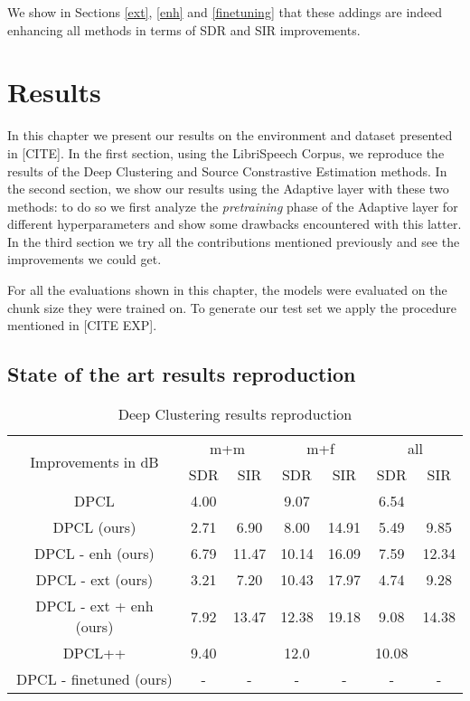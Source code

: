 \documentclass[master,final,11pt]{iscs-thesis}
\begin{document}
We show in Sections \ref{ext}, \ref{enh} and \ref{finetuning} that these addings are indeed enhancing all methods in terms of SDR and SIR improvements.


\chapter{Results}

In this chapter we present our results on the environment and dataset presented in [CITE].
In the first section, using the LibriSpeech Corpus, we reproduce the results of the Deep Clustering and Source Constrastive Estimation methods. In the second section, we show our results using the Adaptive layer with these two methods: to do so we first analyze the \textit{pretraining} phase of the Adaptive layer for different hyperparameters and show some drawbacks encountered with this latter. In the third section we try all the contributions mentioned previously and see the improvements we could get.

For all the evaluations shown in this chapter, the models were evaluated on the chunk size they were trained on. To generate our test set we apply the procedure mentioned in [CITE EXP].
 
\section{State of the art results reproduction}

\begin{table}[ht]
\centering
\begin{tabular}{c|c|c|c|c|c|c}
\multirow{2}{*}{Improvements in dB} & \multicolumn{2}{c|}{m+m} & \multicolumn{2}{c|}{m+f} & \multicolumn{2}{c}{all} \\ 
\cline{2-7} 
 & SDR & SIR & SDR & SIR & SDR & SIR \\ 
\hline 
DPCL \cite{DPCLV1} & 4.00 &  & 9.07 &  & 6.54 &  \\ 
DPCL (ours) & 2.71 & 6.90 & 8.00 & 14.91 & 5.49 & 9.85 
\\ 
\hline 
\hline 
DPCL - enh (ours) & 6.79 & 11.47 & 10.14 & 16.09 & 7.59 & 12.34 \\ 
DPCL - ext (ours) & 3.21 & 7.20 & 10.43 & 17.97 & 4.74 & 9.28 \\ 
DPCL - ext + enh (ours) & 7.92 & 13.47 & 12.38 & 19.18 & 9.08 & 14.38 \\ 
\hline 
\hline 
DPCL++ \cite{DPCLV2} & 9.40 &  & 12.0 &  & 10.08 &  \\ 
DPCL - finetuned (ours) & - & - & - & - & - & - \\ 
\end{tabular}
\captionsetup{justification=centering}
\caption{Deep Clustering results reproduction}
\label{table:DPCLreprod}
\end{table}
\end{document}
